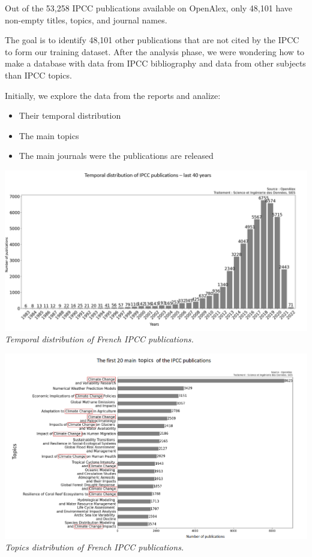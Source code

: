 \documentclass[
]{article}
\providecommand{\tightlist}{%
  \setlength{\itemsep}{0pt}\setlength{\parskip}{0pt}}
\begin{document}
Out of the 53,258 IPCC publications available on OpenAlex, only 48,101
have non-empty titles, topics, and journal names.

The goal is to identify 48,101 other publications that are not cited by
the IPCC to form our training dataset. After the analysis phase, we were
wondering how to make a database with data from IPCC bibliography and
data from other subjects than IPCC topics.

Initially, we explore the data from the reports and analize:

\begin{itemize}
\tightlist
\item
  Their temporal distribution
\item
  The main topics
\item
  The main journals were the publications are released
\end{itemize}

\includegraphics{./images/time_distribution_IPCC_model.png}
\emph{Temporal distribution of French IPCC publications.}

\includegraphics{./images/topics_distribution_IPCC_model.png}
\emph{Topics distribution of French IPCC publications.}
\end{document}
